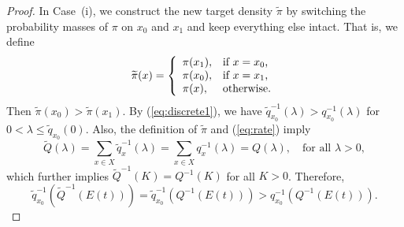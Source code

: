 \documentclass[12pt]{article}
\theoremstyle{plain}
\theoremstyle{definition}
\theoremstyle{remark}
\begin{document}
\begin{proof}
In Case~(i), we construct the new target density $\widetilde{\pi}$ by switching the probability masses of $\pi$ on $x_0$ and $x_1$ and keep everything else intact. That is, we define
\[ \widetilde{\pi}(x)=\left\{
		                           \begin{array}{ll}
		                           \pi(x_1),& \hbox{if $x=x_0$,} \\
					\pi(x_0), & \hbox{if $x=x_1$,} \\
					\pi(x), & \hbox{otherwise.}
		                          \end{array}
		                         \right.		                         
		                         \]
Then $\widetilde{\pi}(x_0)>\widetilde{\pi}(x_1)$.  By (\ref{eq:discrete1}), we have $\widetilde{q}^{-1}_{x_0}(\lambda)>q^{-1}_{x_0}(\lambda)$ for $0<\lambda\leq \widetilde{q}_{x_0}(0)$.  Also,   the definition of $\widetilde{\pi}$ and (\ref{eq:rate}) imply 
\[\widetilde{Q}(\lambda)=\sum_{x\in X}\widetilde{q}_x^{-1}(\lambda)=\sum_{x\in X}q_x^{-1}(\lambda)=Q(\lambda), \quad \text{for all $\lambda>0$},\]
which further implies $\widetilde{Q}^{-1}(K)=Q^{-1}(K)$ for all  $K>0$. Therefore, 
\[\widetilde{q}^{-1}_{x_0}(\widetilde{Q}^{-1}(E(t)))=\widetilde{q}^{-1}_{x_0}(Q^{-1}(E(t)))>q_{x_0}^{-1}(Q^{-1}(E(t))).\]


\end{proof}
\end{document}
